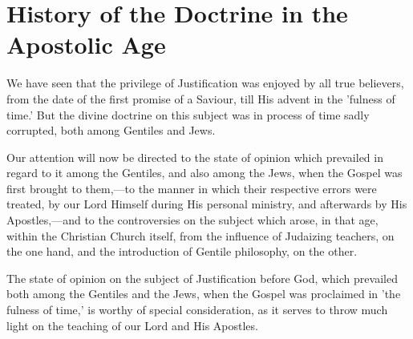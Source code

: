 \documentclass[
]{book}
\begin{document}
\hypertarget{history-of-the-doctrine-in-the-apostolic-age}{%
\chapter{History of the Doctrine in the Apostolic Age}\label{history-of-the-doctrine-in-the-apostolic-age}}

We have seen that the privilege of Justification was enjoyed by all true believers, from the date of the first promise of a Saviour, till His advent in the 'fulness of time.' But the divine doctrine on this subject was in process of time sadly corrupted, both among Gentiles and Jews.

Our attention will now be directed to the state of opinion which prevailed in regard to it among the Gentiles, and also among the Jews, when the Gospel was first brought to them,---to the manner in which their respective errors were treated, by our Lord Himself during His personal ministry, and afterwards by His Apostles,---and to the controversies on the subject which arose, in that age, within the Christian Church itself, from the influence of Judaizing teachers, on the one hand, and the introduction of Gentile philosophy, on the other.

The state of opinion on the subject of Justification before God, which prevailed both among the Gentiles and the Jews, when the Gospel was proclaimed in 'the fulness of time,' is worthy of special consideration, as it serves to throw much light on the teaching of our Lord and His Apostles.
\end{document}
